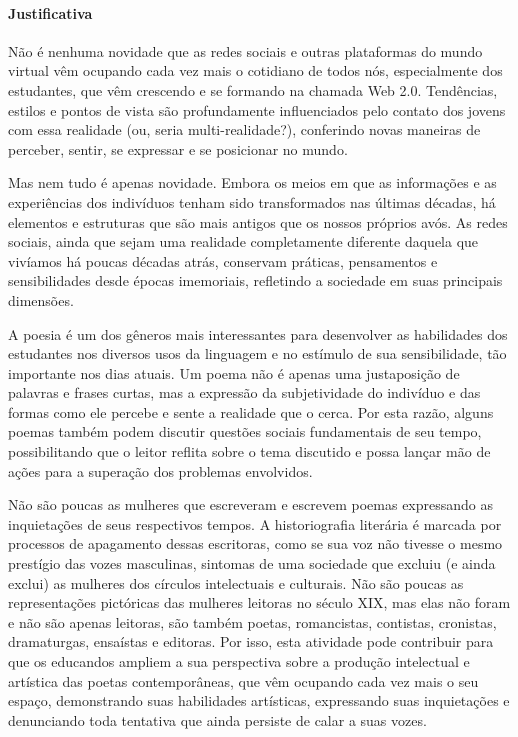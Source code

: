 \documentclass[12pt]{extarticle}
\begin{document}
\paragraph{Justificativa} Não é nenhuma novidade que as redes sociais e
outras plataformas do mundo virtual vêm ocupando cada vez mais o
cotidiano de todos nós, especialmente dos estudantes, que vêm crescendo
e se formando na chamada Web 2.0. Tendências, estilos e pontos de vista
são profundamente influenciados pelo contato dos jovens com essa
realidade (ou, seria multi-realidade?), conferindo novas maneiras de
perceber, sentir, se expressar e se posicionar no mundo.

Mas nem tudo é apenas novidade. Embora os meios em que as informações e
as experiências dos indivíduos tenham sido transformados nas últimas
décadas, há elementos e estruturas que são mais antigos que os nossos
próprios avós. As redes sociais, ainda que sejam uma realidade
completamente diferente daquela que vivíamos há poucas décadas atrás,
conservam práticas, pensamentos e sensibilidades desde épocas
imemoriais, refletindo a sociedade em suas principais dimensões.

A poesia é um dos gêneros mais interessantes para desenvolver as
habilidades dos estudantes nos diversos usos da linguagem e no estímulo
de sua sensibilidade, tão importante nos dias atuais. Um poema não é
apenas uma justaposição de palavras e frases curtas, mas a expressão da
subjetividade do indivíduo e das formas como ele percebe e sente a
realidade que o cerca. Por esta razão, alguns poemas também podem
discutir questões sociais fundamentais de seu tempo, possibilitando que
o leitor reflita sobre o tema discutido e possa lançar mão de ações para
a superação dos problemas envolvidos.

Não são poucas as mulheres que escreveram e escrevem poemas expressando
as inquietações de seus respectivos tempos. A historiografia literária é
marcada por processos de apagamento dessas escritoras, como se sua voz
não tivesse o mesmo prestígio das vozes masculinas, sintomas de uma
sociedade que excluiu (e ainda exclui) as mulheres dos círculos
intelectuais e culturais. Não são poucas as representações pictóricas
das mulheres leitoras no século XIX, mas elas não foram e não são apenas
leitoras, são também poetas, romancistas, contistas, cronistas,
dramaturgas, ensaístas e editoras. Por isso, esta atividade pode
contribuir para que os educandos ampliem a sua perspectiva sobre a
produção intelectual e artística das poetas contemporâneas, que vêm
ocupando cada vez mais o seu espaço, demonstrando suas habilidades
artísticas, expressando suas inquietações e denunciando toda tentativa
que ainda persiste de calar a suas vozes.
\end{document}
